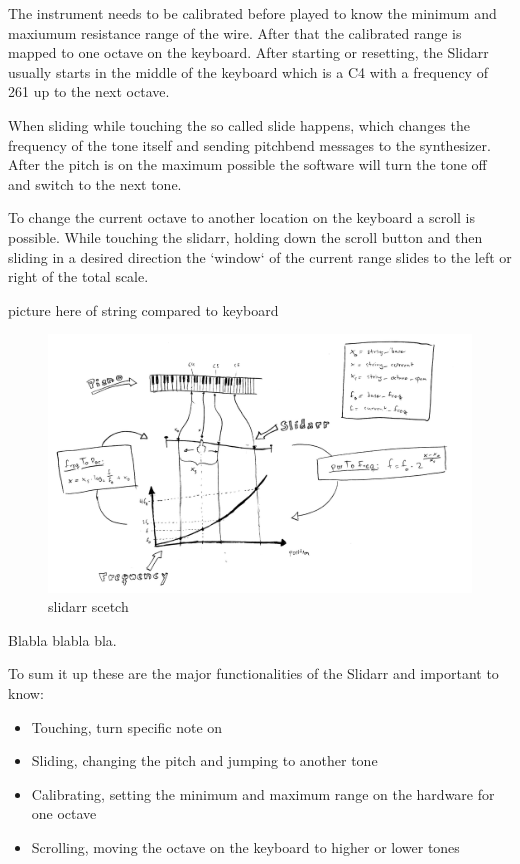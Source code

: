 \documentclass{article}
\begin{document}
The instrument needs to be calibrated before played to know the minimum and maxiumum resistance range of the wire. After that the calibrated range is mapped to one octave on the keyboard. After starting or resetting, the Slidarr usually starts in the middle of the keyboard which is a C4 with a frequency of 261 up to the next octave.

When sliding while touching the so called slide happens, which changes the frequency of the tone itself and sending pitchbend messages to the synthesizer. After the pitch is on the maximum possible the software will turn the tone off and switch to the next tone.

To change the current octave to another location on the keyboard a scroll is possible. While touching the slidarr, holding down the scroll button and then sliding in a desired direction the `window` of the current range slides to the left or right of the total scale.

picture here of string compared to keyboard

\begin{figure}[ht]
  \centering
  \includegraphics[width=1\textwidth]{slidarr_2_.jpg}
  \caption{slidarr scetch}
  \label{fig:slidarr}
\end{figure}

Blabla blabla bla.

To sum it up these are the major functionalities of the Slidarr and important to know:
\begin{itemize}
 \item Touching, turn specific note on
 \item Sliding, changing the pitch and jumping to another tone
 \item Calibrating, setting the minimum and maximum range on the hardware for one octave
 \item Scrolling, moving the octave on the keyboard to higher or lower tones
\end{itemize}
\end{document}
